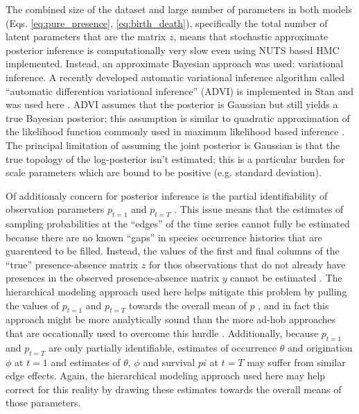 \documentclass[12pt,letterpaper]{article}
\begin{document}
The combined size of the dataset and large number of parameters in both models (Eqs. \ref{eq:pure_presence}, \ref{eq:birth_death}), specifically the total number of latent parameters that are the matrix \(z\), means that stochastic approximate posterior inference is computationally very slow even using NUTS based HMC implemented. Instead, an approximate Bayesian approach was used: variational inference. A recently developed automatic variational inference algorithm called ``automatic differention variational inference'' (ADVI) is implemented in Stan and was used here \citep{Kucukelbir2015,StanDevelopmentTeam2016}. ADVI assumes that the posterior is Gaussian but still yields a true Bayesian posterior; this assumption is similar to quadratic approximation of the likelihood function commonly used in maximum likelihood based inference \citep{McElreath2016}. The principal limitation of assuming the joint posterior is Gaussian is that the true topology of the log-posterior isn't estimated; this is a particular burden for scale parameters which are bound to be positive (e.g. standard deviation).

Of additionaly concern for posterior inference is the partial identifiability of observation parameters \(p_{t = 1}\) and \(p_{t = T}\) \citep{Royle2008}. This issue means that the estimates of sampling probabilities at the ``edges'' of the time series cannot fully be estimated because there are no known ``gaps'' in species occurrence histories that are guarenteed to be filled. Instead, the values of the first and final columns of the ``true'' presence-absence matrix \(z\) for thos observations that do not already have presences in the observed presence-absence matrix \(y\) cannot be estimated \citep{Royle2008}. The hierarchical modeling approach used here helps mitigate this problem by pulling the values of \(p_{t = 1}\) and \(p_{t = T}\) towards the overall mean of \(p\) \citep{Gelman2013d}, and in fact this approach might be more analytically sound than the more ad-hob approaches that are occationally used to overcome this hurdle \citep{Royle2008}. Additionally, because \(p_{t = 1}\) and \(p_{t = T}\) are only partially identifiable, estimates of occurrence \(\theta\) and origination \(\phi\) at \(t = 1\) and estimates of \(\theta\), \(\phi\) and survival \(pi\) at \(t = T\) may suffer from similar edge effects. Again, the hierarchical modeling approach used here may help correct for this reality by drawing these estimates towards the overall means of those parameters.
\end{document}
